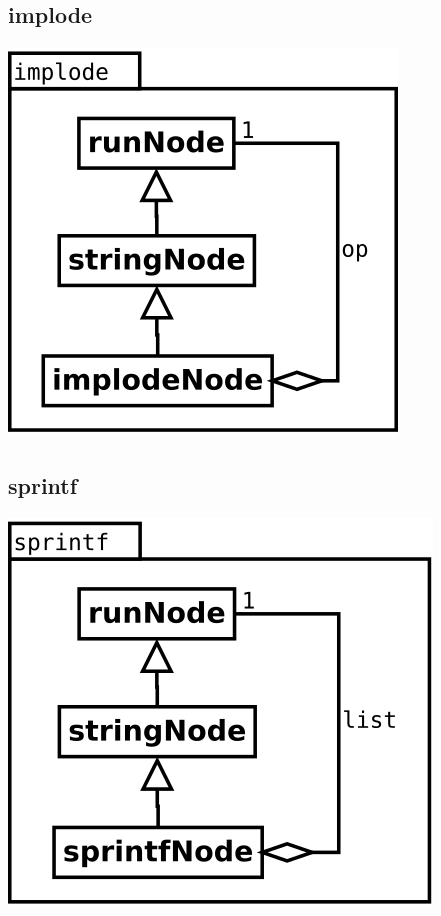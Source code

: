 \subsection {implode}
\begin{center}
\includegraphics[scale=0.4]{implode.png} \\
\end{center}

\subsection {sprintf}
\begin{center}
\includegraphics[scale=0.4]{sprintf.png} \\
\end{center}

